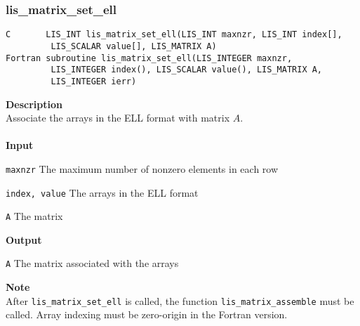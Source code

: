 \documentclass[a4paper]{article}
\newcommand{\namelistlabel}[1]{\mbox{#1}\hfill}
\newenvironment{namelist}[1]{%
\begin{list}{}
  {\let\makelabel\namelistlabel
  \settowidth{\labelwidth}{#1}
  \setlength{\leftmargin}{1.1\labelwidth}}
  }{%
\end{list}}
\begin{document}
\subsubsection{lis\_matrix\_set\_ell}
\begin{screen}
\verb|C       LIS_INT lis_matrix_set_ell(LIS_INT maxnzr, LIS_INT index[],|\\
\verb|         LIS_SCALAR value[], LIS_MATRIX A)|\\
\verb|Fortran subroutine lis_matrix_set_ell(LIS_INTEGER maxnzr,|\\
\verb|         LIS_INTEGER index(), LIS_SCALAR value(), LIS_MATRIX A,|\\
\verb|         LIS_INTEGER ierr)|
\end{screen}
{\bf Description}\\
\indent
Associate the arrays in the ELL format with matrix $A$. 
\\ \\
\noindent
{\bf Input}
\begin{namelist}{XXXXXXXXXXXXXXXXXXXX}
\item[\tt maxnzr] The maximum number of nonzero elements in each row
\item[\tt index, value] The arrays in the ELL format
\item[\tt A] The matrix
\end{namelist}
{\bf Output}
\begin{namelist}{XXXXXXXXXXXXXXXXXXXX}
\item[\tt A] The matrix associated with the arrays
\end{namelist}
\noindent
{\bf Note}\\
\indent
After \verb|lis_matrix_set_ell| is called, 
the function \verb|lis_matrix_assemble| must be called. 
Array indexing must be zero-origin in the Fortran version.
\end{document}
